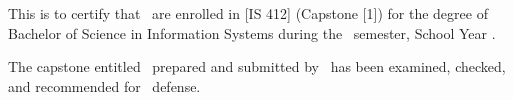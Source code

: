 \clearpage
{}

\noindent This is to certify that \ResearcherNames\ are enrolled in [IS 412] (Capstone [1]) for the degree of Bachelor of Science in Information Systems during the \Semester\ semester, School Year \SchoolYear.


\vspace{12pt}
\noindent The capstone entitled \CapstoneTitleShort\ prepared and submitted by \ResearcherNames\ has been examined, checked, and recommended for \DefenseType\ defense.

